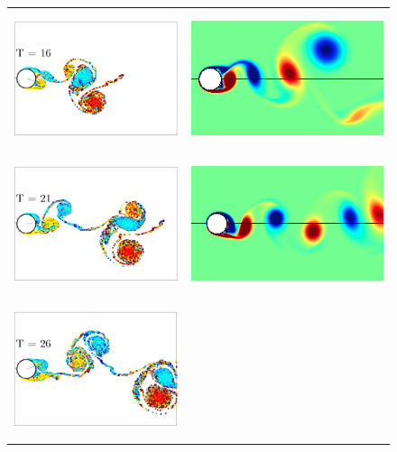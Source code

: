\begin{figure}
 \begin{center}
 \begin{tabular}{cc}
 \includegraphics[height=4cm]{./Figures/results/rotating/vortices_T16.pdf}  &
 \includegraphics[height=4cm]{./Figures/results/rotating/T_16.png}  \\
 \includegraphics[height=4cm]{./Figures/results/rotating/vortices_T21.pdf}  &
 \includegraphics[height=4cm]{./Figures/results/rotating/T_21.png}  \\
 \includegraphics[height=4cm]{./Figures/results/rotating/vortices_T26.pdf}  &

\end{tabular}
\end{center}
\end{figure}
